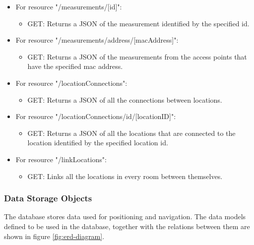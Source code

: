 \begin{itemize}
    \item For resource "/measurements/[id]":
    \begin{itemize}
        \item GET: Returns a JSON of the measurement identified by the specified id.
    \end{itemize}
    
    \item For resource "/measurements/address/[macAddress]":
    \begin{itemize}
        \item GET: Returns a JSON of the measurements from the access points that have the specified mac address.
    \end{itemize}
    
    \item For resource "/locationConnections":
    \begin{itemize}
        \item GET: Returns a JSON of all the connections between locations.
    \end{itemize}
    
    \item For resource "/locationConnections/id/[locationID]":
    \begin{itemize}
        \item GET: Returns a JSON of all the locations that are connected to the location identified by the specified location id.
    \end{itemize}
    
    \item For resource "/linkLocations":
    \begin{itemize}
        \item GET: Links all the locations in every room between themselves.
    \end{itemize}
\end{itemize}

\subsubsection{Data Storage Objects}
\label{sec:data-storage-objects}
The database stores data used for positioning and navigation. The data models defined to be used in the database, together with the relations between them are shown in figure \ref{fig:erd-diagram}.

